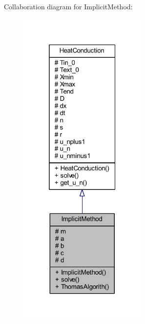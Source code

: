 Collaboration diagram for Implicit\+Method\+:
\nopagebreak
\begin{figure}[H]
\begin{center}
\leavevmode
\includegraphics[width=181pt]{class_implicit_method__coll__graph}
\end{center}
\end{figure}
